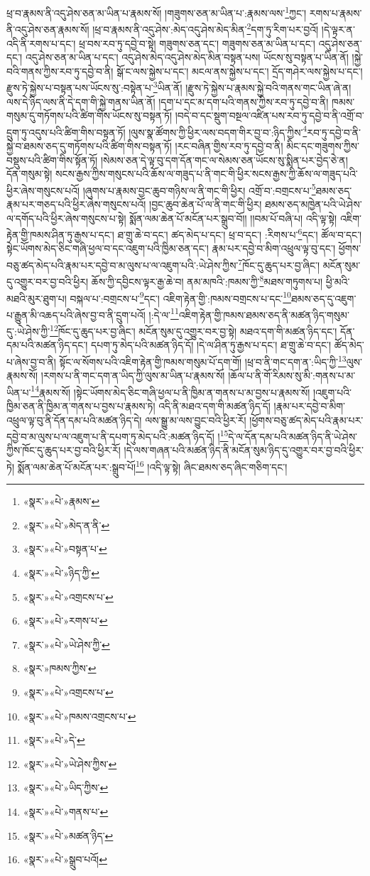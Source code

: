 ཕྲ་བ་རྣམས་ནི་འདུ་ཤེས་ཅན་མ་ཡིན་པ་རྣམས་སོ། །གཟུགས་ཅན་མ་ཡིན་པ་:རྣམས་ལས་\footnote{«སྣར་»«པེ་»རྣམས་}ཀྱང་། རགས་པ་རྣམས་ནི་འདུ་ཤེས་ཅན་རྣམས་སོ། །ཕྲ་བ་རྣམས་ནི་འདུ་ཤེས་:མེད་འདུ་ཤེས་མེད་མིན་\footnote{«སྣར་»«པེ་»མེད་ན་ནི་}དག་ཏུ་རིག་པར་བྱའོ། །དེ་ལྟར་ན་འདི་ནི་རགས་པ་དང་། ཕྲ་བས་རབ་ཏུ་དབྱེ་བ་སྟེ། གཟུགས་ཅན་དང་། གཟུགས་ཅན་མ་ཡིན་པ་དང་། འདུ་ཤེས་ཅན་དང་། འདུ་ཤེས་ཅན་མ་ཡིན་པ་དང་། འདུ་ཤེས་མེད་འདུ་ཤེས་མེད་མིན་བསྟན་པས། ཡོངས་སུ་བསྟན་པ་ཡིན་ནོ། །སྐྱེ་བའི་གནས་ཀྱིས་རབ་ཏུ་དབྱེ་བ་ནི། སྒོ་ང་ལས་སྐྱེས་པ་དང་། མངལ་ནས་སྐྱེས་པ་དང་། དྲོད་གཤེར་ལས་སྐྱེས་པ་དང་། རྫུས་ཏེ་སྐྱེས་པ་བསྟན་པས་ཡོངས་སུ་:བསྟེན་པ་\footnote{«སྣར་»«པེ་»བསྟན་པ་}ཡིན་ནོ། །རྫུས་ཏེ་སྐྱེས་པ་རྣམས་སྐྱེ་བའི་གནས་གང་ཡིན་ཞེ་ན། ལས་དེ་ཉིད་ལས་ནི་དེ་དག་གི་སྐྱེ་གནས་ཡིན་ནོ། །དག་པ་དང་མ་དག་པའི་གནས་ཀྱིས་རབ་ཏུ་དབྱེ་བ་ནི། ཁམས་གསུམ་དུ་གཏོགས་པའི་ཚིག་གིས་ཡོངས་སུ་བསྟན་ཏོ། །བདེ་བ་དང་སྡུག་བསྔལ་འཛིན་པས་རབ་ཏུ་དབྱེ་བ་ནི་འགྲོ་བ་དྲུག་ཏུ་འདུས་པའི་ཚིག་གིས་བསྟན་ཏོ། །ལུས་སྣ་ཚོགས་ཀྱི་ཕྱིར་ལས་བདག་གིར་བྱ་བ་:ཉིད་ཀྱིས་\footnote{«སྣར་»«པེ་»ཉིད་ཀྱི་}རབ་ཏུ་དབྱེ་བ་ནི་སྐྱེ་བ་ཐམས་ཅད་དུ་གཏོགས་པའི་ཚིག་གིས་བསྟན་ཏོ། །རང་བཞིན་གྱིས་རབ་ཏུ་དབྱེ་བ་ནི། མིང་དང་གཟུགས་ཀྱིས་བསྡུས་པའི་ཚིག་གིས་སྟོན་ཏོ། །སེམས་ཅན་དེ་ལྟ་བུ་དག་དོན་གང་ལ་སེམས་ཅན་ཡོངས་སུ་སྨིན་པར་བྱེད་ཅེ་ན། དོན་གསུམ་སྟེ། སངས་རྒྱས་ཀྱིས་གསུངས་པའི་ཆོས་ལ་གཟུད་པ་ནི་གང་གི་ཕྱིར་སངས་རྒྱས་ཀྱི་ཆོས་ལ་གཟུད་པའི་ཕྱིར་ཞེས་གསུངས་པའོ། །ཞུགས་པ་རྣམས་བྱང་ཆུབ་གཉིས་ལ་ནི་གང་གི་ཕྱིར། འགྲོ་བ་:བགྲངས་པ་\footnote{«སྣར་»«པེ་»འགྲངས་པ་}ཐམས་ཅད་རྣམ་པར་གཅད་པའི་ཕྱིར་ཞེས་གསུངས་པའོ། །བྱང་ཆུབ་ཆེན་པོ་ལ་ནི་གང་གི་ཕྱིར། ཐམས་ཅད་མཁྱེན་པའི་ཡེ་ཤེས་ལ་དགོད་པའི་ཕྱིར་ཞེས་གསུངས་པ་སྟེ། སྨོན་ལམ་ཆེན་པོ་མངོན་པར་སྒྲུབ་བོ།། །།བམ་པོ་བཞི་པ། འདི་ལྟ་སྟེ། འཇིག་རྟེན་གྱི་ཁམས་ཤིན་ཏུ་རྒྱས་པ་དང་། ཐ་གྲུ་ཆེ་བ་དང་། ཚད་མེད་པ་དང་། ཕྲ་བ་དང་། :རིགས་པ་\footnote{«སྣར་»«པེ་»རགས་པ་}དང་། ཚོལ་བ་དང་། སྟེང་ཡོགས་མེད་ཅིང་གཞི་ཕྱལ་བ་དང་འཇུག་པའི་ཁྱིམ་ཅན་དང་། རྣམ་པར་དབྱེ་བ་མིག་འཕྲུལ་ལྟ་བུ་དང་། ཕྱོགས་བཅུ་ཚད་མེད་པའི་རྣམ་པར་དབྱེ་བ་མ་ལུས་པ་ལ་འཇུག་པའི་:ཡེ་ཤེས་ཀྱིས་\footnote{«སྣར་»«པེ་»ཡེ་ཤེས་ཀྱི་}ཁོང་དུ་ཆུད་པར་བྱ་ཞིང་། མངོན་སུམ་དུ་འགྱུར་བར་བྱ་བའི་ཕྱིར། ཆོས་ཀྱི་དབྱིངས་ལྟར་རྒྱ་ཆེ་བ། ནམ་མཁའི་:ཁམས་ཀྱི་\footnote{«སྣར་»ཁམས་ཀྱིས་}མཐས་གཏུགས་པ། ཕྱི་མའི་མཐའི་མུར་ཐུག་པ། བསྐལ་པ་:བགྲངས་པ་\footnote{«སྣར་»«པེ་»འགྲངས་པ་}དང་། འཇིག་རྟེན་གྱི་:ཁམས་བགྲངས་པ་དང་\footnote{«སྣར་»«པེ་»ཁམས་འགྲངས་པ་}ཐམས་ཅད་དུ་འཇུག་པ་རྒྱུན་མི་འཆད་པའི་ཞེས་བྱ་བ་ནི་དྲུག་པའོ། །:དེ་ལ་\footnote{«སྣར་»«པེ་»དེ་}འཇིག་རྟེན་གྱི་ཁམས་ཐམས་ཅད་ནི་མཚན་ཉིད་གསུམ་དུ་:ཡེ་ཤེས་ཀྱི་\footnote{«སྣར་»«པེ་»ཡེ་ཤེས་ཀྱིས་}ཁོང་དུ་ཆུད་པར་བྱ་ཞིང་། མངོན་སུམ་དུ་འགྱུར་བར་བྱ་སྟེ། མཐའ་དག་གི་མཚན་ཉིད་དང་། དོན་དམ་པའི་མཚན་ཉིད་དང་། དཔག་ཏུ་མེད་པའི་མཚན་ཉིད་དོ། །དེ་ལ་ཤིན་ཏུ་རྒྱས་པ་དང་། ཐ་གྲུ་ཆེ་བ་དང་། ཚོད་མེད་པ་ཞེས་བྱ་བ་ནི། སྟོང་ལ་སོགས་པའི་འཇིག་རྟེན་གྱི་ཁམས་གསུམ་པོ་དག་གོ། །ཕྲ་བ་ནི་གང་དག་ན་:ཡིད་ཀྱི་\footnote{«སྣར་»«པེ་»ཡིད་ཀྱིས་}ལུས་རྣམས་སོ། །རགས་པ་ནི་གང་དག་ན་ཡིད་ཀྱི་ལུས་མ་ཡིན་པ་རྣམས་སོ། །ཆོལ་པ་ནི་གོ་རིམས་སུ་མི་:གནས་པ་མ་ཡིན་པ་\footnote{«སྣར་»«པེ་»གནས་པ་}རྣམས་སོ། །སྟེང་ཡོགས་མེད་ཅིང་གཞི་ཕྱལ་པ་ནི་ཁྱིམ་ན་གནས་པ་མ་བྱས་པ་རྣམས་སོ། །འཇུག་པའི་ཁྱིམ་ཅན་ནི་ཁྱིམ་ན་གནས་པ་བྱས་པ་རྣམས་ཏེ། འདི་ནི་མཐའ་དག་གི་མཚན་ཉིད་དོ། །རྣམ་པར་དབྱེ་བ་མིག་འཕྲུལ་ལྟ་བུ་ནི་དོན་དམ་པའི་མཚན་ཉིད་དེ། ལས་སྒྱུ་མ་ལས་བྱུང་བའི་ཕྱིར་རོ། །ཕྱོགས་བཅུ་ཚད་མེད་པའི་རྣམ་པར་དབྱེ་བ་མ་ལུས་པ་ལ་འཇུག་པ་ནི་དཔག་ཏུ་མེད་པའི་:མཚན་ཉིད་དོ། །\footnote{«སྣར་»«པེ་»མཚན་ཉིད་}དེ་ལ་དོན་དམ་པའི་མཚན་ཉིད་ནི་ཡེ་ཤེས་ཀྱིས་ཁོང་དུ་ཆུད་པར་བྱ་བའི་ཕྱིར་རོ། །དེ་ལས་གཞན་པའི་མཚན་ཉིད་ནི་མངོན་སུམ་ཉིད་དུ་འགྱུར་བར་བྱ་བའི་ཕྱིར་ཏེ། སྨོན་ལམ་ཆེན་པོ་མངོན་པར་:སྒྲུབ་པོ།\footnote{«སྣར་»«པེ་»སྒྲུབ་པའོ།} །འདི་ལྟ་སྟེ། ཞིང་ཐམས་ཅད་ཞིང་གཅིག་དང་། 